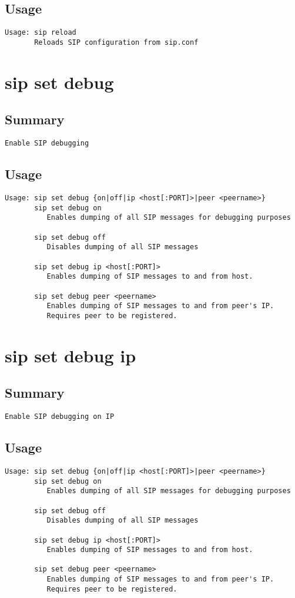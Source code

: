 \subsection{Usage}
\begin{verbatim}
Usage: sip reload
       Reloads SIP configuration from sip.conf

\end{verbatim}


\section{sip set debug}
\subsection{Summary}
\begin{verbatim}
Enable SIP debugging
\end{verbatim}
\subsection{Usage}
\begin{verbatim}
Usage: sip set debug {on|off|ip <host[:PORT]>|peer <peername>}
       sip set debug on
          Enables dumping of all SIP messages for debugging purposes

       sip set debug off
          Disables dumping of all SIP messages

       sip set debug ip <host[:PORT]>
          Enables dumping of SIP messages to and from host.

       sip set debug peer <peername>
          Enables dumping of SIP messages to and from peer's IP.
          Requires peer to be registered.

\end{verbatim}


\section{sip set debug ip}
\subsection{Summary}
\begin{verbatim}
Enable SIP debugging on IP
\end{verbatim}
\subsection{Usage}
\begin{verbatim}
Usage: sip set debug {on|off|ip <host[:PORT]>|peer <peername>}
       sip set debug on
          Enables dumping of all SIP messages for debugging purposes

       sip set debug off
          Disables dumping of all SIP messages

       sip set debug ip <host[:PORT]>
          Enables dumping of SIP messages to and from host.

       sip set debug peer <peername>
          Enables dumping of SIP messages to and from peer's IP.
          Requires peer to be registered.

\end{verbatim}



